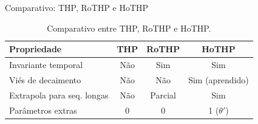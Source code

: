 \documentclass[aspectratio=169]{beamer}
\begin{document}


\begin{frame}{Comparativo: THP, RoTHP e HoTHP}
  \begin{table}
    \centering
    \begin{tabular}{lccc}
      \toprule
      \textbf{Propriedade} & \textbf{THP} & \textbf{RoTHP} & \textbf{HoTHP} \\
      \midrule
      Invariante temporal        & Não  & Sim  & Sim \\
      Viés de decaimento         & Não  & Não  & Sim (aprendido) \\
      Extrapola para seq. longas & Não  & Parcial & Sim \\
      Parâmetros extras          & 0    & 0    & 1 ($\theta'$) \\
      \bottomrule
    \end{tabular}
    \caption{Comparativo entre THP, RoTHP e HoTHP.}
  \end{table}
\end{frame}
\end{document}
